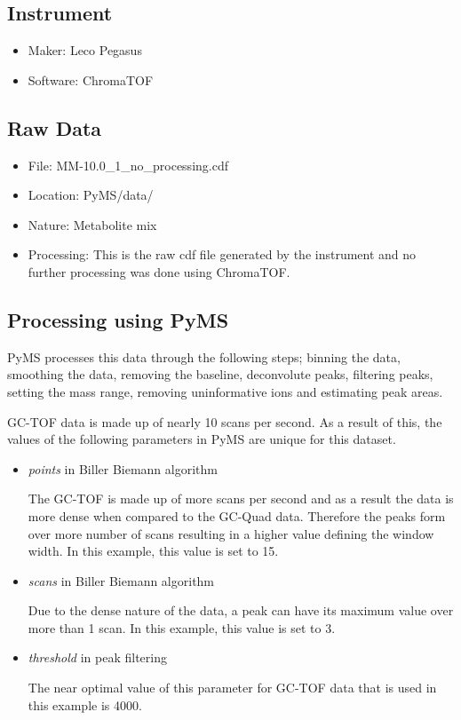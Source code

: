 \subsection{Instrument}
\noindent

\begin{itemize}
  \item Maker: Leco Pegasus
  \item Software: ChromaTOF
\end{itemize}

\subsection{Raw Data}
\noindent

\begin{itemize}
  \item File: MM-10.0\_1\_no\_processing.cdf
  \item Location: PyMS/data/
  \item Nature: Metabolite mix
  \item Processing: This is the raw cdf file generated by the instrument and no further 
   processing was done using ChromaTOF. 
\end{itemize}


\subsection{Processing using PyMS}
\noindent

PyMS processes this data through the following steps; binning the data, smoothing the data, 
removing the baseline, deconvolute peaks, filtering peaks, setting the mass range, 
removing uninformative ions and estimating peak areas. 

GC-TOF data is made up of nearly 10 scans per second. As a result of this, the values of 
the following parameters in PyMS are unique for this dataset. 

\begin{itemize}
  \item \emph{points} in Biller Biemann algorithm

   The GC-TOF is made up of more scans per second and as a result the data is more dense when 
   compared to the GC-Quad data. Therefore the peaks form over more number of scans resulting 
   in a higher value defining the window width. In this example, this value is set to 15. 

  \item \emph{scans} in Biller Biemann algorithm

   Due to the dense nature of the data, a peak can have its maximum value over more than 1 scan. 
   In this example, this value is set to 3. 

  \item \emph{threshold} in peak filtering

   The near optimal value of this parameter for GC-TOF data that is used in this example is 4000. 

\end{itemize}
